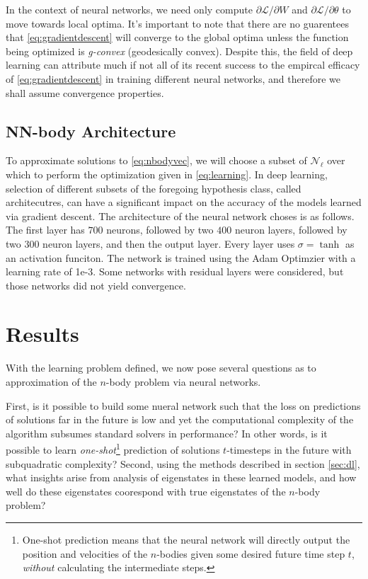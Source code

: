 \documentclass{article}
\numberwithin{theorem}{section}
\numberwithin{equation}{section}
\def\scriptl{{\mathcal L}}
\def\scriptn{{\mathcal N}}
\begin{document}
 In the context of neural networks, we need only compute $\partial \scriptl/\partial W$ and $\partial \scriptl/\partial \theta$ to move towards local optima. It's important to note that  there are no guarentees that \eqref{eq:gradientdescent} will converge to the global optima unless the function being optimized is \emph{g-convex} (geodesically convex). Despite this, the field of deep learning can attribute much if not all of its recent success to the empircal efficacy of \eqref{eq:gradientdescent} in training different neural networks, and therefore we shall assume convergence properties. 

 \subsection{NN-body Architecture}
To approximate solutions to \eqref{eq:nbodyvec}, we will choose a subset of $\scriptn_\ell$ over which to perform the optimization given in \eqref{eq:learning}. In deep learning, selection of different subsets of the foregoing hypothesis class, called architecutres, can have a significant impact on the accuracy of the models learned via gradient descent. The architecture of the neural network choses is as follows. The first layer has $700$ neurons, followed by two $400$ neuron layers, followed by two $300$ neuron layers, and then the output layer. Every layer uses $\sigma = \tanh$ as an activation funciton. The network is trained using the Adam Optimzier with a learning rate of 1e-3. Some networks with residual layers were considered, but those networks did not yield convergence.

 \section{Results}
With the learning problem defined, we now pose several questions as to approximation of the $n$-body problem via neural networks.

 First, is it possible to build some nueral network such that the loss on predictions of solutions far in the future is low and yet the computational complexity of the algorithm subsumes standard solvers in performance? In other words, is it possible to learn \emph{one-shot}\footnote{One-shot prediction means that the neural network will directly output the position and velocities of the $n$-bodies given some desired future time step $t$, \emph{without} calculating the intermediate steps.} prediction of solutions $t$-timesteps in the future with subquadratic complexity? Second, using the methods described in section \ref{sec:dl}, what insights arise from analysis of eigenstates in these learned models, and how well do these eigenstates coorespond with true eigenstates of the $n$-body problem?
\end{document}

